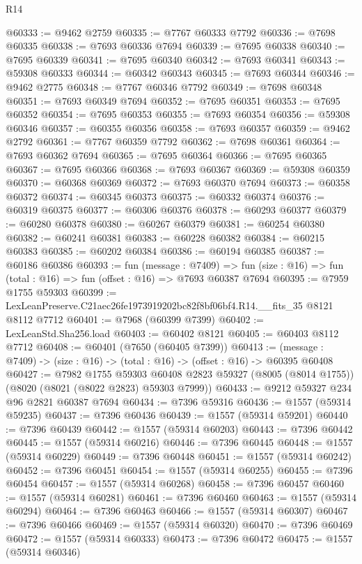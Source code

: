 \begin{lexlean}{R14}
\begin{coremodule}
@60333 := @9462 @2759
@60335 := @7767 @60333 @7792
@60336 := @7698 @60335
@60338 := @7693 @60336 @7694
@60339 := @7695 @60338
@60340 := @7695 @60339
@60341 := @7695 @60340
@60342 := @7693 @60341
@60343 := @59308 @60333
@60344 := @60342 @60343
@60345 := @7693 @60344
@60346 := @9462 @2775
@60348 := @7767 @60346 @7792
@60349 := @7698 @60348
@60351 := @7693 @60349 @7694
@60352 := @7695 @60351
@60353 := @7695 @60352
@60354 := @7695 @60353
@60355 := @7693 @60354
@60356 := @59308 @60346
@60357 := @60355 @60356
@60358 := @7693 @60357
@60359 := @9462 @2792
@60361 := @7767 @60359 @7792
@60362 := @7698 @60361
@60364 := @7693 @60362 @7694
@60365 := @7695 @60364
@60366 := @7695 @60365
@60367 := @7695 @60366
@60368 := @7693 @60367
@60369 := @59308 @60359
@60370 := @60368 @60369
@60372 := @7693 @60370 @7694
@60373 := @60358 @60372
@60374 := @60345 @60373
@60375 := @60332 @60374
@60376 := @60319 @60375
@60377 := @60306 @60376
@60378 := @60293 @60377
@60379 := @60280 @60378
@60380 := @60267 @60379
@60381 := @60254 @60380
@60382 := @60241 @60381
@60383 := @60228 @60382
@60384 := @60215 @60383
@60385 := @60202 @60384
@60386 := @60194 @60385
@60387 := @60186 @60386
@60393 := fun (message : @7409) =>
  fun (size : @16) => fun (total : @16) => fun (offset : @16) => @7693 @60387 @7694
@60395 := @7959 @1755 @59303
@60399 := LexLeanPreserve.C21aec26fe1973919202bc82f8bf06bf4.R14.__fits_35 @8121 @8112 @7712
@60401 := @7968 (@60399 @7399)
@60402 := LexLeanStd.Sha256.load
@60403 := @60402 @8121
@60405 := @60403 @8112 @7712
@60408 := @60401 (@7650 (@60405 @7399))
@60413 := (message : @7409) -> (size : @16) -> (total : @16) -> (offset : @16) -> @60395 @60408
@60427 := @7982
    @1755
    @59303
    @60408
    @2823
    @59327
    (@8005 (@8014 @1755))
    (@8020 (@8021 (@8022 @2823) @59303 @7999))
@60433 := @9212 @59327 @234 @96 @2821 @60387 @7694
@60434 := @7396 @59316
@60436 := @1557 (@59314 @59235)
@60437 := @7396 @60436
@60439 := @1557 (@59314 @59201)
@60440 := @7396 @60439
@60442 := @1557 (@59314 @60203)
@60443 := @7396 @60442
@60445 := @1557 (@59314 @60216)
@60446 := @7396 @60445
@60448 := @1557 (@59314 @60229)
@60449 := @7396 @60448
@60451 := @1557 (@59314 @60242)
@60452 := @7396 @60451
@60454 := @1557 (@59314 @60255)
@60455 := @7396 @60454
@60457 := @1557 (@59314 @60268)
@60458 := @7396 @60457
@60460 := @1557 (@59314 @60281)
@60461 := @7396 @60460
@60463 := @1557 (@59314 @60294)
@60464 := @7396 @60463
@60466 := @1557 (@59314 @60307)
@60467 := @7396 @60466
@60469 := @1557 (@59314 @60320)
@60470 := @7396 @60469
@60472 := @1557 (@59314 @60333)
@60473 := @7396 @60472
@60475 := @1557 (@59314 @60346)

\end{coremodule}
\end{lexlean}

